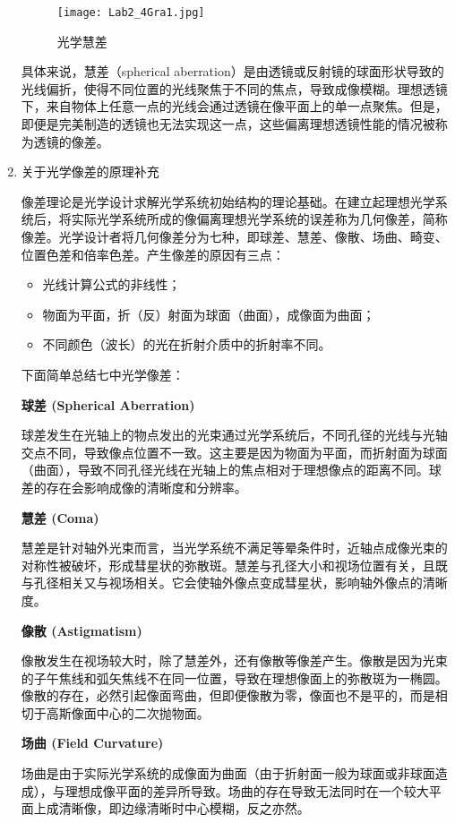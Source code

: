 \documentclass[dvipsnames, svgnames,a4paper,11pt]{article}
\begin{document}
\begin{enumerate}
		\begin{figure}[htbp]
			\centering
			\texttt{[image: Lab2\_4Gra1.jpg]}
			\caption{光学慧差}
			\label{fig:fig1}
		\end{figure}
		
		具体来说，慧差（spherical aberration）是由透镜或反射镜的球面形状导致的光线偏折，使得不同位置的光线聚焦于不同的焦点，导致成像模糊。理想透镜下，来自物体上任意一点的光线会通过透镜在像平面上的单一点聚焦。但是，即便是完美制造的透镜也无法实现这一点，这些偏离理想透镜性能的情况被称为透镜的像差。
		
		\item 关于光学像差的原理补充
		
		像差理论是光学设计求解光学系统初始结构的理论基础。在建立起理想光学系统后，将实际光学系统所成的像偏离理想光学系统的误差称为几何像差，简称像差。光学设计者将几何像差分为七种，即球差、慧差、像散、场曲、畸变、位置色差和倍率色差。产生像差的原因有三点：
		\begin{itemize}
			\item 光线计算公式的非线性；
			\item 物面为平面，折（反）射面为球面（曲面），成像面为曲面；
			\item 不同颜色（波长）的光在折射介质中的折射率不同。
		\end{itemize}
		
		下面简单总结七中光学像差：
		
		\textbf{球差 (Spherical Aberration)}
		
		球差发生在光轴上的物点发出的光束通过光学系统后，不同孔径的光线与光轴交点不同，导致像点位置不一致。这主要是因为物面为平面，而折射面为球面（曲面），导致不同孔径光线在光轴上的焦点相对于理想像点的距离不同。球差的存在会影响成像的清晰度和分辨率。
		
		\textbf{慧差 (Coma)}
		
		慧差是针对轴外光束而言，当光学系统不满足等晕条件时，近轴点成像光束的对称性被破坏，形成彗星状的弥散斑。慧差与孔径大小和视场位置有关，且既与孔径相关又与视场相关。它会使轴外像点变成彗星状，影响轴外像点的清晰度。
		
		\textbf{像散 (Astigmatism)}
		
		像散发生在视场较大时，除了慧差外，还有像散等像差产生。像散是因为光束的子午焦线和弧矢焦线不在同一位置，导致在理想像面上的弥散斑为一椭圆。像散的存在，必然引起像面弯曲，但即便像散为零，像面也不是平的，而是相切于高斯像面中心的二次抛物面。
		
		\textbf{场曲 (Field Curvature)}
		
		场曲是由于实际光学系统的成像面为曲面（由于折射面一般为球面或非球面造成），与理想成像平面的差异所导致。场曲的存在导致无法同时在一个较大平面上成清晰像，即边缘清晰时中心模糊，反之亦然。
		

\end{enumerate}
\end{document}

